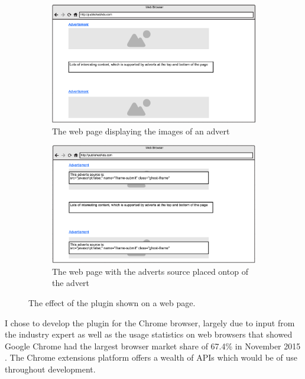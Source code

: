 \documentclass[12pt]{article}
\begin{document}
\begin{figure}[H]
    \begin{subfigure}{0.3\textwidth}
        \includegraphics[scale=0.25]{siteWithAds.png}
        \caption{The web page displaying the images of an advert}
        \label{fig:siteWithAds}
    \end{subfigure} \hspace{0.2\textwidth}
    \begin{subfigure}{0.3\textwidth}
        \includegraphics[scale=0.25]{siteWithAdSource.png}
        \caption{The web page with the adverts source placed ontop of the advert}
        \label{fig:siteWithAdSource}
    \end{subfigure}
    \caption{The effect of the plugin shown on a web page.}
    \label{fig:mockup}
\end{figure}

I chose to develop the plugin for the Chrome browser, largely due to input from the industry expert as well as the usage statistics on web browsers that showed Google Chrome had the largest browser market share of 67.4\% in November 2015 \parencite{browserStats}. The Chrome extensions platform offers a wealth of APIs which would be of use throughout development. \\
\end{document}
